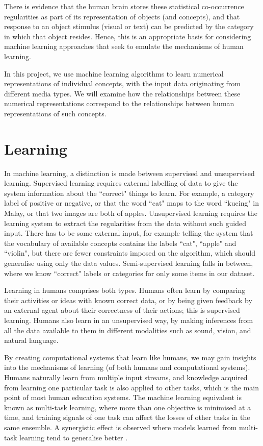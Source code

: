 There is evidence \cite{CoocurrenceVisionLanguage2021} that the human brain stores these statistical co-occurrence regularities  as part of its representation of objects (and concepts), and that response to an object stimulus (visual or text) can be predicted by the category in which that object resides. Hence, this is an appropriate basis for considering machine learning approaches that seek to emulate the mechanisms of human learning. 

In this project, we use machine learning algorithms to learn numerical representations of individual concepts, with the input data originating from different media types. We will examine how the relationships between these numerical representations correspond to the relationships between human representations of such concepts. 

\section{Learning}
In machine learning, a distinction is made between supervised and unsupervised learning. Supervised learning requires external labelling of data to give the system information about the ``correct" things to learn. For example, a category label of positive or negative, or that the word ``cat" maps to the word ``kucing" in Malay, or that two images are both of apples. Unsupervised learning requires the learning system to extract the regularities from the data without such guided input. There has to be some external input, for example telling the system that the vocabulary of available concepts contains the labels ``cat", ``apple" and ``violin", but there are fewer constraints imposed on the algorithm, which should generalise using only the data values. Semi-supervised learning falls in between, where we know ``correct" labels or categories for only some items in our dataset. 

Learning in humans comprises both types. Humans often learn by comparing their activities or ideas with known correct data, or by being given feedback by an external agent about their correctness of their actions; this is supervised learning. Humans also learn in an unsupervised way, by making inferences from all the data available to them in different modalities such as sound, vision, and natural language. 

By creating computational systems that learn like humans, we may gain insights into the mechanisms of learning (of both humans and computational systems). Humans naturally learn from multiple input streams, and knowledge acquired from learning one particular task is also applied to other tasks, which is the main point of most human education systems. The machine learning equivalent is known as multi-task learning, where more than one objective is minimised at a time, and training signals of one task can affect the losses of other tasks in the same ensemble. A synergistic effect is observed where models learned from multi-task learning tend to generalise better \cite{OverviewMultiTaskLearning}.

